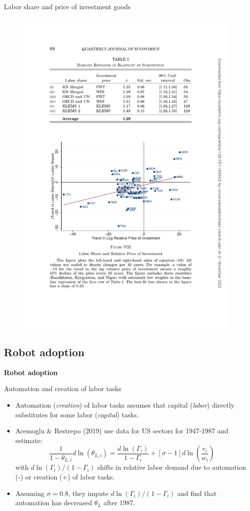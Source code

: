 \documentclass[notes=show]{beamer}
\begin{document}
\begin{frame}{Labor share and price of investment goods}
\begin{figure}[p!]
 \includegraphics[width=.7\textwidth]{figure-KN-8.pdf} 
\end{figure}
\end{frame}

\subsection*{Robot adoption}

\begin{frame}
	\centering
	\textbf{Robot adoption}
\end{frame}

\begin{frame}{Automation and creation of labor tasks}
\begin{itemize}
\item Automation (\textit{creation}) of labor tasks assumes that capital (\textit{labor}) directly substitutes for some labor (\textit{capital}) tasks. \medskip
\item Acemoglu \& Restrepo (2019) use data for US sectors for 1947-1987 and estimate:
\begin{equation*}
    \frac{1}{1 - \theta_{L,i}} d \ln(\theta_{L,i}) = \frac{d \ln(\Gamma_{i})}{1- \Gamma_{i}} + [\sigma -1] d \ln(\frac{r_{i}}{w_{i}}) \tag{AR-A10}
\end{equation*}
with $ d \ln(\Gamma_{i}) / (1- \Gamma_{i})$ shifts in relative labor demand due to automation (-) or creation (+) of labor tasks. \medskip
\item Assuming $\sigma = 0.8$, they impute $ d \ln(\Gamma_{i}) / (1- \Gamma_{i}) $ and find that automation has decreased $ \theta_{L} $ after 1987.
\end{itemize}
\end{frame}
\end{document}
